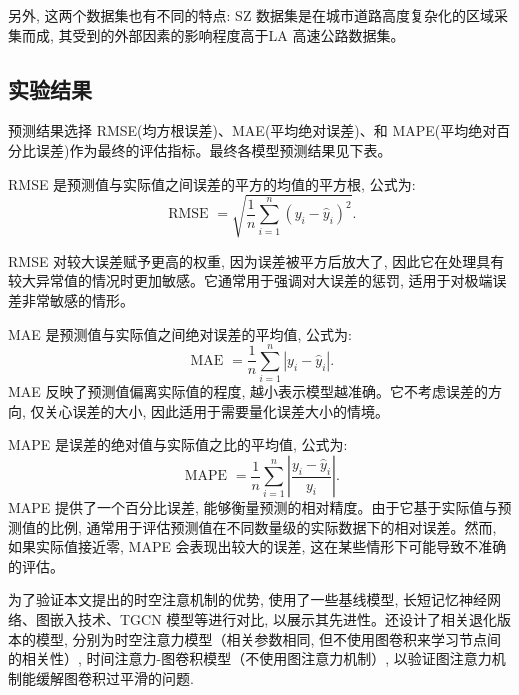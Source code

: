 另外, 这两个数据集也有不同的特点: SZ 数据集是在城市道路高度复杂化的区域采集而成, 其受到的外部因素的影响程度高于LA 高速公路数据集。


\subsection{实验结果}


预测结果选择 RMSE(均方根误差)、MAE(平均绝对误差)、和 MAPE(平均绝对百分比误差)作为最终的评估指标。最终各模型预测结果见下表。

RMSE 是预测值与实际值之间误差的平方的均值的平方根, 公式为:
\[
\text{ RMSE } = \sqrt{\frac{1}{{n}}\mathop{\sum }\limits_{{{i} = 1}}^{{n}}{\left( {{y}}_{{i}} - {\widehat{{y}}}_{{i}}\right) }^{2}}.
\]

RMSE 对较大误差赋予更高的权重, 因为误差被平方后放大了, 因此它在处理具有较大异常值的情况时更加敏感。它通常用于强调对大误差的惩罚, 适用于对极端误差非常敏感的情形。

MAE 是预测值与实际值之间绝对误差的平均值, 公式为:
\[
\text{ MAE } = \frac{1}{{n}}\mathop{\sum }\limits_{{{i} = 1}}^{{n}}\left| {{{y}}_{{i}} - {\widehat{{y}}}_{{i}}}\right|.
\]
MAE 反映了预测值偏离实际值的程度, 越小表示模型越准确。它不考虑误差的方向, 仅关心误差的大小, 因此适用于需要量化误差大小的情境。

MAPE 是误差的绝对值与实际值之比的平均值, 公式为:
\[
\text{ MAPE } = \frac{1}{{n}}\mathop{\sum }\limits_{{{i} = 1}}^{{n}}\left| \frac{{{y}}_{{i}} - {\widehat{{y}}}_{{i}}}{{{y}}_{{i}}}\right|.
\]
MAPE 提供了一个百分比误差, 能够衡量预测的相对精度。由于它基于实际值与预测值的比例, 通常用于评估预测值在不同数量级的实际数据下的相对误差。然而, 如果实际值接近零, MAPE 会表现出较大的误差, 这在某些情形下可能导致不准确的评估。

为了验证本文提出的时空注意机制的优势, 使用了一些基线模型, 长短记忆神经网络、图嵌入技术、TGCN 模型等进行对比, 以展示其先进性。还设计了相关退化版本的模型, 分别为时空注意力模型（相关参数相同, 但不使用图卷积来学习节点间的相关性）, 时间注意力-图卷积模型（不使用图注意力机制）, 以验证图注意力机制能缓解图卷积过平滑的问题. 


